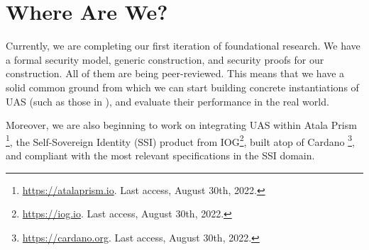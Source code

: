\section{Where Are We?}
\label{sec:status}

Currently, we are completing our first iteration of foundational research. We
have a formal security model, generic construction, and security proofs for our
construction. All of them are being peer-reviewed.
This means that we have a solid common ground from which we can
start building concrete instantiations of UAS (such as those in
), and evaluate their performance in the real world.

Moreover, we are also beginning to work on integrating UAS within Atala Prism%
\footnote{\url{https://atalaprism.io}. Last access, August 30th, 2022.}, the
Self-Sovereign Identity (SSI) product from IOG\footnote{\url{https://iog.io}.
  Last access, August 30th, 2022.}, built atop of Cardano%
\footnote{\url{https://cardano.org}. Last access, August 30th, 2022.}, and
compliant with the most relevant specifications in the SSI domain.

